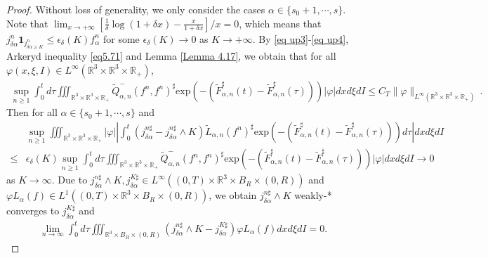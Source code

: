 \documentclass[reqno,11pt]{amsart}
\numberwithin{equation}{section}
\def\R{\mathbb{R}}
\def\exp{\mathrm{exp}}
\begin{document}
\begin{proof}
Without loss of generality, we only consider the cases $\alpha \in \{s_0+1,\cdots,s\}$. Note that $ \lim_{x \to + \infty} [ \frac{1}{\delta} \log (1 + \delta x) - \frac{x}{1 + \delta x} ] / x = 0 $, which means that $j^n_{\delta \alpha} \mathbf{1}_{j^n_{\delta \alpha\geq K}} \leq \epsilon_\delta (K) f^n_\alpha$ for some $\epsilon_\delta (K)\rightarrow 0$ as $K\rightarrow +\infty$. By \eqref{eq up3}-\eqref{eq up4}, Arkeryd inequality \eqref{eq5.71}  and Lemma \ref{Lemma 4.17}, we obtain that for all $\varphi (x, \xi, I) \in L^\infty (\R^3 \times \R^3 \times \R_+)$,
\begin{equation*}
  \begin{aligned}
    \sup \limits_{n \geq 1} \int_{0}^{t} d \tau \iiint_{ \R^3 \times \R^3 \times \R_+} \tilde{Q}^-_{\alpha ,n} (f^n,f^n)^\sharp  \exp(-(\tilde{F}^\sharp _{\alpha ,n } (t)- \tilde{F}^\sharp _{\alpha ,n } (\tau))) |\varphi| dxd\xi dI \leq C_T \| \varphi \|_{ L^\infty ( \R^3 \times \R^3 \times \R_+ ) } \,.
  \end{aligned}
\end{equation*}
Then for all $\alpha \in \{s_0+1,\cdots,s\}$ and
\begin{equation}\label{eq8.98}
	\begin{aligned}
		&\sup \limits_{n \geq 1} \iiint_{ \R^3 \times \R^3 \times \R_+} |\varphi| |\int_{0}^{t} (j^{n\sharp}_{\delta \alpha }-j^{n\sharp}_{\delta \alpha }\wedge K)\tilde{L}_{\alpha ,n}(f^n)^\sharp \exp(-(\tilde{F}^\sharp _{\alpha ,n } (t)- \tilde{F}^\sharp _{\alpha ,n } (\tau)))d \tau |dxd\xi dI \\
		\leq & \epsilon_\delta (K)\sup \limits_{n \geq 1} \int_{0}^{t} d \tau \iiint_{ \R^3 \times \R^3 \times \R_+} \tilde{Q}^-_{\alpha ,n} (f^n,f^n)^\sharp  \exp(-(\tilde{F}^\sharp _{\alpha ,n } (t)- \tilde{F}^\sharp _{\alpha ,n } (\tau))) |\varphi| dxd\xi dI \rightarrow 0 
	\end{aligned}
\end{equation}
as $K\rightarrow \infty$. Due to $j^{n\sharp}_{\delta \alpha }\wedge K,j^{K\sharp}_{\delta \alpha }\in L^\infty ( (0, T) \times \R^3 \times B_R \times (0, R) )$ and $\varphi L_{\alpha}(f)\in L^1 ( (0, T) \times \R^3 \times B_R \times (0, R) )$, we obtain  $j^{n\sharp}_{\delta \alpha }\wedge K $ weakly-* converges to $ j^{K\sharp}_{\delta \alpha }$ and
\begin{equation*}
	\begin{aligned}
		\lim \limits_{n \rightarrow \infty} \int_{0}^{t}d \tau \iiint_{ \R^3 \times B_R \times (0,R)}  (j^{n\sharp}_{\delta \alpha }\wedge K -j^{K\sharp}_{\delta \alpha } ) \varphi L_{\alpha}(f) dxd\xi dI = 0 .

\end{aligned}
\end{equation*}
\end{proof}
\end{document}
